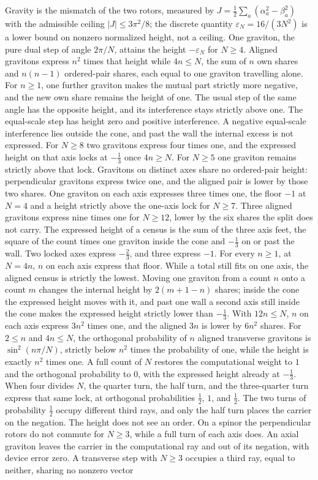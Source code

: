 \documentclass[a4paper]{article}
\begin{document}
Gravity is the mismatch of the two rotors, measured by $J=\frac12\sum_a(\alpha_a^2-\beta_a^2)$ with the admissible ceiling $|J|\le 3\pi^2/8$; the discrete quantity $\varepsilon_N=16/(3N^2)$ is a lower bound on nonzero normalized height, not a ceiling. One graviton, the pure dual step of angle $2\pi/N$, attains the height $-\varepsilon_N$ for $N\ge 4$. Aligned gravitons express $n^2$ times that height while $4n\le N$, the sum of $n$ own shares and $n(n-1)$ ordered-pair shares, each equal to one graviton travelling alone. For $n\ge 1$, one further graviton makes the mutual part strictly more negative, and the new own share remains the height of one. The usual step of the same angle has the opposite height, and its interference stays strictly above one. The equal-scale step has height zero and positive interference. A negative equal-scale interference lies outside the cone, and past the wall the internal excess is not expressed. For $N\ge 8$ two gravitons express four times one, and the expressed height on that axis locks at $-\frac13$ once $4n\ge N$. For $N\ge 5$ one graviton remains strictly above that lock. Gravitons on distinct axes share no ordered-pair height: perpendicular gravitons express twice one, and the aligned pair is lower by those two shares. One graviton on each axis expresses three times one, the floor $-1$ at $N=4$ and a height strictly above the one-axis lock for $N\ge 7$. Three aligned gravitons express nine times one for $N\ge 12$, lower by the six shares the split does not carry. The expressed height of a census is the sum of the three axis feet, the square of the count times one graviton inside the cone and \(-\frac13\) on or past the wall. Two locked axes express \(-\frac23\), and three express \(-1\). For every \(n\ge 1\), at \(N=4n\), \(n\) on each axis express that floor. While a total still fits on one axis, the aligned census is strictly the lowest. Moving one graviton from a count \(n\) onto a count \(m\) changes the internal height by \(2(m+1-n)\) shares; inside the cone the expressed height moves with it, and past one wall a second axis still inside the cone makes the expressed height strictly lower than \(-\frac13\). With \(12n\le N\), \(n\) on each axis express \(3n^2\) times one, and the aligned \(3n\) is lower by \(6n^2\) shares. For \(2\le n\) and \(4n\le N\), the orthogonal probability of \(n\) aligned transverse gravitons is \(\sin^2(n\pi/N)\), strictly below \(n^2\) times the probability of one, while the height is exactly \(n^2\) times one. A full count of \(N\) restores the computational weight to \(1\) and the orthogonal probability to \(0\), with the expressed height already at \(-\frac13\). When four divides \(N\), the quarter turn, the half turn, and the three-quarter turn express that same lock, at orthogonal probabilities \(\frac12\), \(1\), and \(\frac12\). The two turns of probability \(\frac12\) occupy different third rays, and only the half turn places the carrier on the negation. The height does not see an order. On a spinor the perpendicular rotors do not commute for $N\ge 3$, while a full turn of each axis does. An axial graviton leaves the carrier in the computational ray and out of its negation, with device error zero. A transverse step with \(N\ge 3\) occupies a third ray, equal to neither, sharing no nonzero vector 
\end{document}
